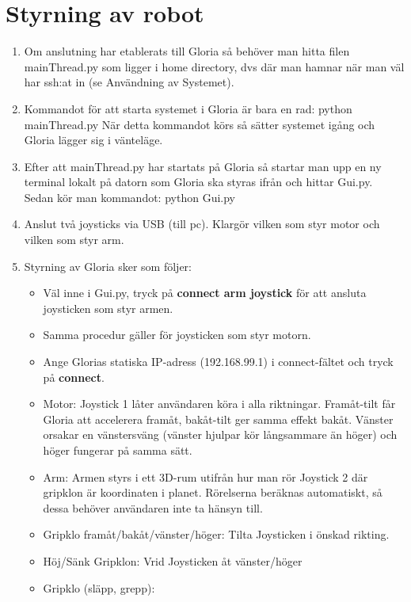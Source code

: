 \section{Styrning av robot}
\begin{enumerate}
	\item Om anslutning har etablerats till Gloria så behöver man hitta filen mainThread.py som ligger i home directory, dvs där man hamnar när man väl har ssh:at in (se Användning av Systemet).
	\item Kommandot för att starta systemet i Gloria är bara en rad: python mainThread.py
	När detta kommandot körs så sätter systemet igång och Gloria lägger sig i vänteläge.
	\item Efter att mainThread.py har startats på Gloria så startar man upp en ny terminal lokalt på datorn som Gloria ska styras ifrån och hittar Gui.py. Sedan kör man kommandot: python Gui.py
	\item Anslut två joysticks via USB (till pc). Klargör vilken som styr motor och vilken som styr arm.
	\item Styrning av Gloria sker som följer: 
	\begin{itemize}
		\item Väl inne i Gui.py, tryck på \textbf{connect arm joystick} för att ansluta joysticken som styr armen.
		\item Samma procedur gäller för joysticken som styr motorn.
		\item Ange Glorias statiska IP-adress (192.168.99.1) i connect-fältet och tryck på \textbf{connect}.
		\item Motor: Joystick 1 låter användaren köra i alla riktningar. Framåt-tilt får Gloria att accelerera framåt, bakåt-tilt ger samma effekt bakåt. Vänster orsakar en vänstersväng (vänster hjulpar kör långsammare än höger) och höger fungerar på samma sätt.
		\item Arm: Armen styrs i ett 3D-rum utifrån hur man rör Joystick 2 där gripklon är koordinaten i planet. Rörelserna beräknas automatiskt, så dessa behöver användaren inte ta hänsyn till. 
		\item Gripklo framåt/bakåt/vänster/höger: Tilta Joysticken i önskad rikting.
		\item Höj/Sänk Gripklon: Vrid Joysticken åt vänster/höger
		\item Gripklo (släpp, grepp): %
		

\end{itemize}
\end{enumerate}
